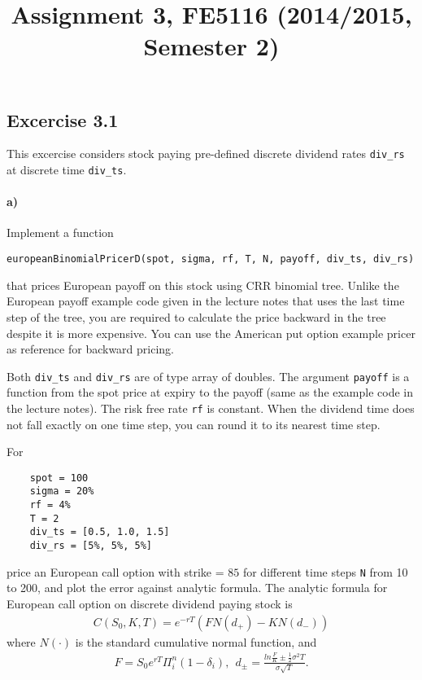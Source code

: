 \documentclass[12pt,a4paper,hidelinks,fleqn]{article}            %
\title{\vspace{-5ex}Assignment 3, FE5116 (2014/2015, Semester 2)\vspace{-7ex}}
\date{}
\begin{document}
\maketitle

\subsection*{Excercise 3.1}
 
This excercise considers stock paying pre-defined discrete dividend rates \verb=div_rs= at discrete time \verb=div_ts=. 
\vspace{-1cm}
\paragraph{a)} Implement a function 
\vspace{-5mm}
\begin{verbatim}
europeanBinomialPricerD(spot, sigma, rf, T, N, payoff, div_ts, div_rs)
\end{verbatim}
\vspace{-5mm}
that prices European payoff on this stock using CRR binomial tree.
Unlike the European payoff example code given in the lecture notes that uses the last time step of the tree, 
you are required to calculate the price backward in the tree despite it is more expensive. 
You can use the American put option example pricer as reference for backward pricing.  

Both \verb=div_ts= and \verb=div_rs= are of type array of doubles.
The argument \verb=payoff= is a function from the spot price at expiry to the payoff (same as the example code in the lecture notes). 
The risk free rate \verb=rf= is constant.
When the dividend time does not fall exactly on one time step, 
you can round it to its nearest time step.


For 
\vspace{-1cm} 
\begin{verbatim}
    spot = 100
    sigma = 20%
    rf = 4%
    T = 2
    div_ts = [0.5, 1.0, 1.5]
    div_rs = [5%, 5%, 5%]
\end{verbatim} 
price an European call option with strike = $85$ for different time steps \verb=N= from 10 to 200,
and plot the error against analytic formula. 
The analytic formula for European call option on discrete dividend paying stock is
\begin{align*}
C(S_0, K, T) = e^{-rT} (F N(d_+) - K N(d_-))
\end{align*}
where $N(\cdot)$ is the standard cumulative normal function, and
\begin{align*}
F = S_0 e^{rT} \Pi_i^n (1-\delta_i), ~~
d_{\pm} = \frac{ln\frac{F}{K}  \pm \frac{1}{2}\sigma^2T}{\sigma\sqrt{T}}.
\end{align*}
\end{document}
